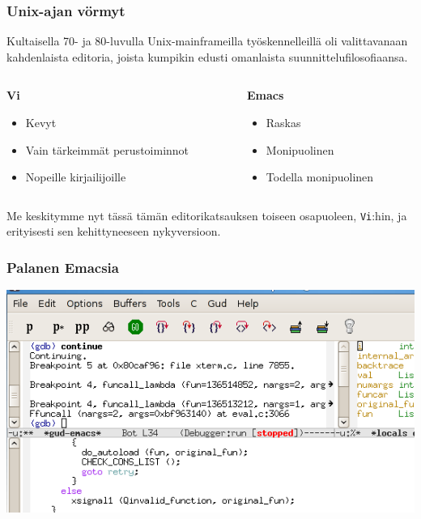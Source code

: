 \documentclass[]{beamer}
\newcommand{\Tohj}[1]{\texttt{#1}}
\begin{document}
\begin{frame}[t]
\frametitle{Unix-ajan vörmyt}

Kultaisella 70- ja 80-luvulla Unix-mainframeilla työskennelleillä oli valittavanaan kahdenlaista editoria, joista kumpikin edusti omanlaista suunnittelufilosofiaansa.

\vspace{0.4cm}
\begin{columns}[t]
 \begin{column}{0.5\textwidth}
  \textbf{Vi}
  \begin{itemize}
    \item Kevyt
    \item Vain tärkeimmät perustoiminnot
    \item Nopeille kirjailijoille
    \end{itemize}
\end{column}
\begin{column}{0.5\textwidth}
  \textbf{Emacs}
  \begin{itemize}
    \item Raskas
    \item Monipuolinen
    \item Todella monipuolinen
    \end{itemize}
\end{column}
\end{columns}
\vspace{0.4cm}

Me keskitymme nyt tässä tämän editorikatsauksen toiseen osapuoleen, \Tohj{Vi}:hin, ja erityisesti sen kehittyneeseen nykyversioon.
\end{frame} 

\begin{frame}
  \frametitle{Palanen Emacsia}
  \includegraphics[width=\textwidth]{27-04_emacs}
\end{frame}
\end{document}
